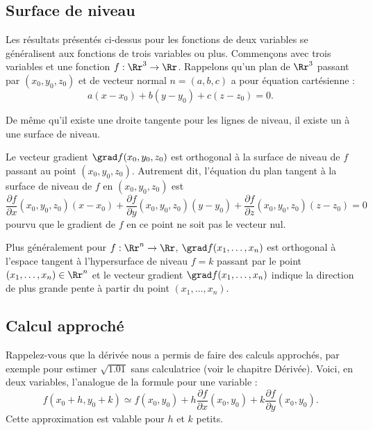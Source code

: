\documentclass[11pt,class=report,crop=false]{standalone}
\begin{document}
\subsection{Surface de niveau}

Les résultats présentés ci-dessus pour les fonctions de deux variables se généralisent aux fonctions de trois variables ou plus.
Commençons avec trois variables et une fonction $f:\Rr^3 \to \Rr$.
Rappelons qu'un plan de $\Rr^3$ passant par $(x_0,y_0,z_0)$ et de vecteur normal 
$n=(a,b,c)$ a pour équation cartésienne :
$$a(x-x_0)+b(y-y_0)+c(z-z_0) = 0.$$


De même qu'il existe une droite tangente pour les lignes de niveau, il existe un  à une surface de niveau.


\begin{proposition}
Le vecteur gradient $\grad f(x_0,y_0,z_0)$ est orthogonal à la surface de niveau de $f$ passant au point $(x_0,y_0,z_0)$. Autrement dit,
l'équation du plan tangent à la surface de niveau de $f$ en $(x_0,y_0,z_0)$ est 
$$\frac{\partial f}{\partial x}(x_0,y_0,z_0)(x-x_0)
+\frac{\partial f}{\partial y}(x_0,y_0,z_0)(y-y_0)
+\frac{\partial f}{\partial z}(x_0,y_0,z_0)(z-z_0)
 = 0 $$
pourvu que le gradient de $f$ en ce point ne soit pas le vecteur nul.
\end{proposition}




Plus généralement pour $f : \Rr^n \to \Rr$, $\grad f (x_1,\ldots,x_n)$ est orthogonal à l'espace tangent à
l'hypersurface de niveau $f=k$ passant par le point $(x_1,\ldots,x_n)\in\Rr^n$ et 
le vecteur gradient $\grad f(x_1,\ldots,x_n)$ indique la direction de plus grande pente à partir du point $(x_1,\ldots,x_n)$.



\subsection{Calcul approché}

Rappelez-vous que la dérivée nous a permis de faire des calculs approchés, par exemple pour estimer $\sqrt{1.01}$ sans calculatrice (voir le chapitre \og{}Dérivée\fg{}).
Voici, en deux variables, l'analogue de la formule pour une variable : 
$$f(x_0+h,y_0+k) \simeq f(x_0,y_0) + h\frac{\partial f}{\partial x}(x_0,y_0)
+k\frac{\partial f}{\partial y}(x_0,y_0).$$
Cette approximation est valable pour $h$ et $k$ petits.
\end{document}
